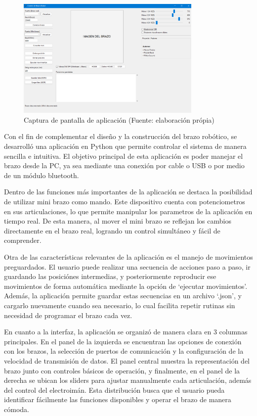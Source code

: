 \begin{figure}[H]
  \centering
  \includegraphics[width=0.8\textwidth]{anexos/software/ventanaApp.png}
  \caption{Captura de pantalla de aplicación (Fuente: elaboración própia)}\label{fig:captura.ventanaApp}
\end{figure}

Con el fin de complementar el diseño y la construcción del brazo robótico, se desarrolló una aplicación en Python que permite controlar el sistema de manera sencilla e intuitiva. El objetivo principal de esta aplicación es poder manejar el brazo desde la PC, ya sea mediante una conexión por cable o USB o por medio de un módulo bluetooth.

Dentro de las funciones más importantes de la aplicación se destaca la posibilidad de utilizar mini brazo como mando. Este dispositivo cuenta con potenciometros en sus articulaciones, lo que permite manipular los parametros de la aplicación en tiempo real. De esta manera, al mover el mini brazo se reflejan los cambios directamente en el brazo real, logrando un control simultáneo y fácil de comprender.

Otra de las características relevantes de la aplicación es el manejo de movimientos preguardados. El usuario puede realizar una secuencia de acciones paso a paso, ir guardando las posiciónes intermedias, y posteriormente reproducir ese movimientos de forma automática mediante la opción de `ejecutar movimientos'. Además, la aplicación permite guardar estas secuencias en un archivo `.json', y cargarlo nuevamente cuando sea necesario, lo cual facilita repetir rutinas sin necesidad de programar el brazo cada vez.

En cuanto a la interfaz, la aplicación se organizó de manera clara en 3 columnas principales. En el panel de la izquierda se encuentran las opciones de conexión con los brazos, la selección de puertos de comunicación y la configuración de la velocidad de transmisión de datos. El panel central muestra la representación del brazo junto con controles básicos de operación, y finalmente, en el panel de la derecha se ubican los sliders para ajustar manualmente cada articulación, además del control del electroimán. Esta distribución busca que el usuario pueda identificar fácilmente las funciones disponibles y operar el brazo de manera cómoda.


